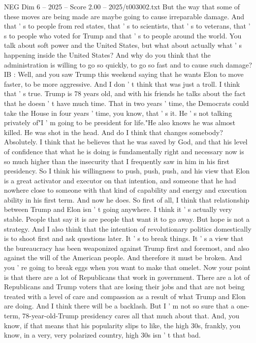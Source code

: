 \begin{textsample}{NEG Dim 6 – 2025 – Score 2.00 – 2025/t003002.txt}
But the way that some of these moves are being made are maybe going to cause irreparable damage.
And that ' s to people from red states, that ' s to scientists, that ' s to veterans, that ' s to people who voted for Trump and that ' s to people around the world.
You talk about soft power and the United States, but what about actually what ' s happening inside the United States?
And why do you think that the administration is willing to go so quickly, to go so fast and to cause such damage?
IB : Well, and you saw Trump this weekend saying that he wants Elon to move faster, to be more aggressive.
And I don ' t think that was just a troll.
I think that ' s true.
Trump is 78 years old, and with his friends he talks about the fact that he doesn ' t have much time.
That in two years ' time, the Democrats could take the House in four years ' time, you know, that ' s it.
He ' s not talking privately of"I ' m going to be president for life."He also knows he was almost killed.
He was shot in the head.
And do I think that changes somebody?
Absolutely.
I think that he believes that he was saved by God, and that his level of confidence that what he is doing is fundamentally right and necessary now is so much higher than the insecurity that I frequently saw in him in his first presidency.
So I think his willingness to push, push, push, and his view that Elon is a great activator and executor on that intention, and someone that he had nowhere close to someone with that kind of capability and energy and execution ability in his first term.
And now he does.
So first of all, I think that relationship between Trump and Elon isn ' t going anywhere.
I think it ' s actually very stable.
People that say it is are people that want it to go away.
But hope is not a strategy.
And I also think that the intention of revolutionary politics domestically is to shoot first and ask questions later.
It ' s to break things.
It ' s a view that the bureaucracy has been weaponized against Trump first and foremost, and also against the will of the American people.
And therefore it must be broken.
And you ' re going to break eggs when you want to make that omelet.
Now your point is that there are a lot of Republicans that work in government.
There are a lot of Republicans and Trump voters that are losing their jobs and that are not being treated with a level of care and compassion as a result of what Trump and Elon are doing.
And I think there will be a backlash.
But I ' m not so sure that a one-term, 78-year-old-Trump presidency cares all that much about that.
And, you know, if that means that his popularity slips to like, the high 30s, frankly, you know, in a very, very polarized country, high 30s isn ' t that bad.

\end{textsample}

